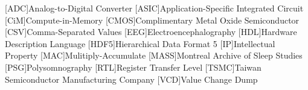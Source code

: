\begin{acronym}
    {\small{}
    [ADC]{Analog-to-Digital Converter}
    [ASIC]{Application-Specific Integrated Circuit}
    [CiM]{Compute-in-Memory}
    [CMOS]{Complimentary Metal Oxide Semiconductor}
    [CSV]{Comma-Separated Values}
    [EEG]{Electroencephalography}
    [HDL]{Hardware Description Language}
    [HDF5]{Hierarchical Data Format 5}
    [IP]{Intellectual Property}
    [MAC]{Mulitiply-Accumulate}
    [MASS]{Montreal Archive of Sleep Studies}
    [PSG]{Polysomnography}
    [RTL]{Register Transfer Level}
    [TSMC]{Taiwan Semiconductor Manufacturing Company}
    [VCD]{Value Change Dump}
    }
\end{acronym}